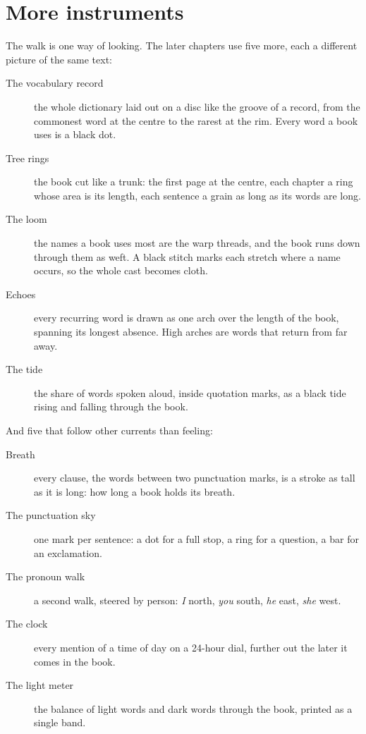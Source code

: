 \section{More instruments}

The walk is one way of looking. The later chapters use five more, each a
different picture of the same text:

\begin{description}
\item[The vocabulary record] the whole dictionary laid out on a disc like the
groove of a record, from the commonest word at the centre to the rarest at the
rim. Every word a book uses is a black dot.
\item[Tree rings] the book cut like a trunk: the first page at the centre,
each chapter a ring whose area is its length, each sentence a grain as long as
its words are long.
\item[The loom] the names a book uses most are the warp threads, and the book
runs down through them as weft. A black stitch marks each stretch where a name
occurs, so the whole cast becomes cloth.
\item[Echoes] every recurring word is drawn as one arch over the length of
the book, spanning its longest absence. High arches are words that return from
far away.
\item[The tide] the share of words spoken aloud, inside quotation marks, as a
black tide rising and falling through the book.
\end{description}

\noindent And five that follow other currents than feeling:

\begin{description}
\item[Breath] every clause, the words between two punctuation marks, is a
stroke as tall as it is long: how long a book holds its breath.
\item[The punctuation sky] one mark per sentence: a dot for a full stop, a ring
for a question, a bar for an exclamation.
\item[The pronoun walk] a second walk, steered by person: \emph{I} north,
\emph{you} south, \emph{he} east, \emph{she} west.
\item[The clock] every mention of a time of day on a 24-hour dial, further out
the later it comes in the book.
\item[The light meter] the balance of light words and dark words through the
book, printed as a single band.
\end{description}

